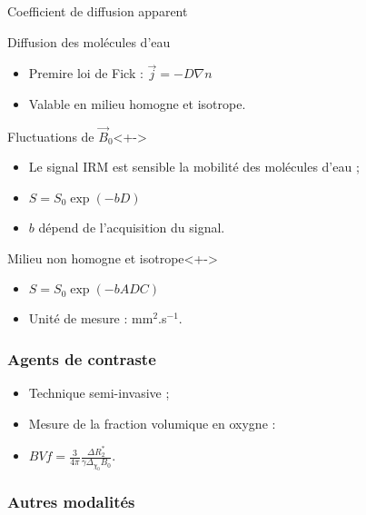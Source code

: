 \begin{frame}{Coefficient de diffusion apparent}

\begin{block}{Diffusion des mol\'ecules d'eau}
\begin{itemize}
\item<+-> Premire loi de Fick : $\vec{j}=-D\nabla n$
\item<+-> Valable en milieu homogne et isotrope.
\end{itemize}
\end{block}

\begin{block}{Fluctuations de $\vec{B}_0$}<+->
\begin{itemize}
\item<+-> Le signal IRM est sensible  la mobilit\'e des mol\'ecules d'eau ;
\item<+-> $S=S_0\exp\left(-bD\right)$
\item<+-> $b$ d\'epend de l'acquisition du signal.
\end{itemize}
\end{block}

\begin{block}{Milieu non homogne et isotrope}<+->
\begin{itemize}
\item<+-> $S=S_0\exp\left(-bADC\right)$
\item<+-> Unit\'e de mesure : mm${}^2$.s${}^{-1}$.
\end{itemize}
\end{block}

\end{frame}

\subsubsection{Agents de contraste}
\begin{frame}
\begin{itemize}
\item<+-> Technique semi-invasive ;
\item<+-> Mesure de la fraction volumique en oxygne :
\item<+-> $BVf=\frac{3}{4\pi}\frac{\Delta R_2^{\ast}}{\gamma \Delta_{\chi_0}B_0}$.
\end{itemize}
\end{frame}

\subsubsection{Autres modalit\'es}


